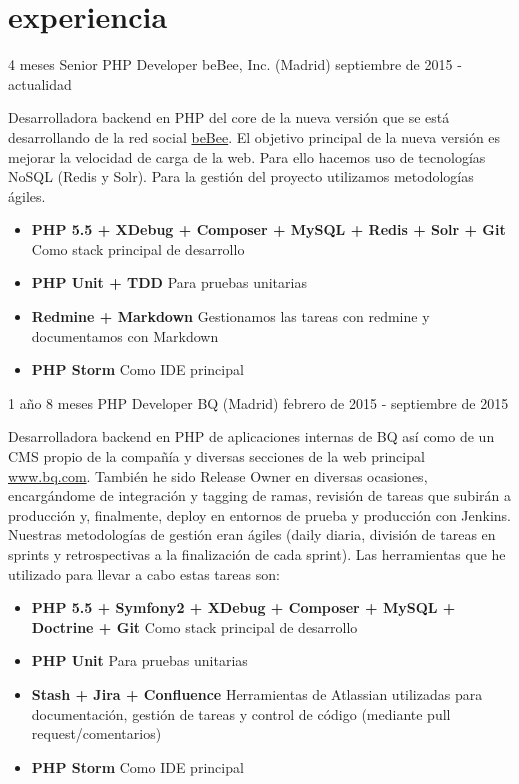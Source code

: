 \documentclass[]{friggeri-cv} %
\begin{document}

\section{experiencia}
\begin{entrylist}
\entry
{4 meses}
{Senior PHP Developer {\normalfont beBee, Inc. (Madrid)}}
{septiembre de 2015 - actualidad}
{Desarrolladora backend en PHP del core de la nueva versión que se est\'a desarrollando de la red social \href{http://bebee.com}{beBee}. El objetivo principal de la nueva versi\'on es mejorar la velocidad de carga de la web. Para ello hacemos uso de tecnolog\'ias NoSQL (Redis y Solr). Para la gesti\'on del proyecto utilizamos metodolog\'ias \'agiles.
\begin{itemize}
\item\textbf{PHP 5.5 + XDebug + Composer + MySQL + Redis + Solr + Git} Como stack principal de desarrollo
\item\textbf{PHP Unit + TDD} Para pruebas unitarias
\item\textbf{Redmine + Markdown} Gestionamos las tareas con redmine y documentamos con Markdown
\item\textbf{PHP Storm} Como IDE principal\\
\end{itemize}}
\end{entrylist}
\begin{entrylist}
\entry
{1 año 8 meses}
{PHP Developer {\normalfont BQ (Madrid)}}
{febrero de 2015 - septiembre de 2015}
{Desarrolladora backend en PHP de aplicaciones internas de BQ as\'i como de un CMS propio de la compa\~n\'ia y diversas secciones de la web principal \href{http://bq.com}{www.bq.com}. Tambi\'en he sido Release Owner en diversas ocasiones, encarg\'andome de integraci\'on y tagging de ramas, revisi\'on de tareas que subir\'an a producci\'on y, finalmente, deploy en entornos de prueba y producci\'on con Jenkins. 
Nuestras metodolog\'ias de gesti\'on eran \'agiles (daily diaria, divisi\'on de tareas en sprints y retrospectivas a la finalizaci\'on de cada sprint).
 Las herramientas que he utilizado para llevar a cabo estas tareas son:
\begin{itemize}
\item\textbf{PHP 5.5 + Symfony2 + XDebug + Composer + MySQL + Doctrine + Git} Como stack principal de desarrollo
\item\textbf{PHP Unit} Para pruebas unitarias
\item\textbf{Stash + Jira + Confluence} Herramientas de Atlassian utilizadas para documentación, gesti\'on de tareas y control de c\'odigo (mediante pull request/comentarios)
\item\textbf{PHP Storm} Como IDE principal\\
\end{itemize}}
\end{entrylist}
\end{document}
